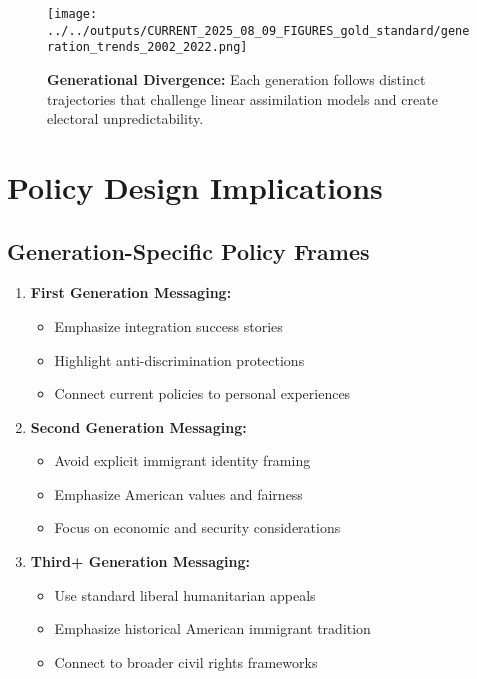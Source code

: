 \documentclass[11pt,letterpaper]{article}
\begin{document}
\begin{figure}[H]
    \centering
    \texttt{[image: ../../outputs/CURRENT\_2025\_08\_09\_FIGURES\_gold\_standard/generation\_trends\_2002\_2022.png]}
    \caption{\textbf{Generational Divergence:} Each generation follows distinct trajectories that challenge linear assimilation models and create electoral unpredictability.}
    \label{fig:generation_trends}
\end{figure}

\section{Policy Design Implications}

\subsection{Generation-Specific Policy Frames}
\begin{enumerate}
    \item \textbf{First Generation Messaging:}
        \begin{itemize}
            \item Emphasize integration success stories
            \item Highlight anti-discrimination protections
            \item Connect current policies to personal experiences
        \end{itemize}
    
    \item \textbf{Second Generation Messaging:}
        \begin{itemize}
            \item Avoid explicit immigrant identity framing
            \item Emphasize American values and fairness
            \item Focus on economic and security considerations
        \end{itemize}
    
    \item \textbf{Third+ Generation Messaging:}
        \begin{itemize}
            \item Use standard liberal humanitarian appeals
            \item Emphasize historical American immigrant tradition
            \item Connect to broader civil rights frameworks
        \end{itemize}
\end{enumerate}
\end{document}
